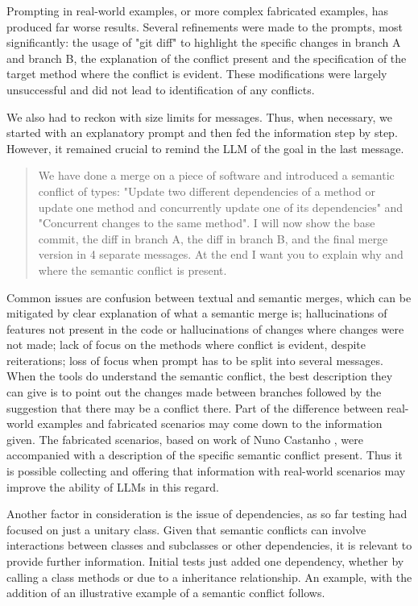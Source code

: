Prompting in real-world examples, or more complex fabricated examples, has produced far worse results. Several refinements were made to the prompts, most significantly: the usage of "git diff" to highlight the specific changes in branch A and branch B, the explanation of the conflict present and the specification of the target method where the conflict is evident. These modifications were largely unsuccessful and did not lead to identification of any conflicts.

We also had to reckon with size limits for messages. Thus, when necessary, we started with an explanatory prompt and then fed the information step by step. However, it remained crucial to remind the LLM of the goal in the last message.

\begin{quote}
We have done a merge on a piece of software and introduced a semantic conflict of types: "Update two different dependencies of a method or update one method and concurrently update one of its dependencies" and "Concurrent changes to the same method". I will now show the base commit, the diff in branch A, the diff in branch B, and the final merge version in 4 separate messages. At the end I want you to explain why and where the semantic conflict is present.
\end{quote}

Common issues are confusion between textual and semantic merges, which can be mitigated by clear explanation of what a semantic merge is; hallucinations of features not present in the code or hallucinations of changes where changes were not made; lack of focus on the methods where conflict is evident, despite reiterations; loss of focus when prompt has to be split into several messages. When the tools do understand the semantic conflict, the best description they can give is to point out the changes made between branches followed by the suggestion that there may be a conflict there.
Part of the difference between real-world examples and fabricated scenarios may come down to the information given. The fabricated scenarios, based on work of Nuno Castanho \cite{kn:nuno}, were accompanied with a description of the specific semantic conflict present. Thus it is possible collecting and offering that information with real-world scenarios may improve the ability of LLMs in this regard.

Another factor in consideration is the issue of dependencies, as so far testing had focused on just a unitary class. Given that semantic conflicts can involve interactions between classes and subclasses or other dependencies, it is relevant to provide further information. Initial tests just added one dependency, whether by calling a class methods or due to a inheritance relationship. An example, with the addition of an illustrative example of a semantic conflict follows.

